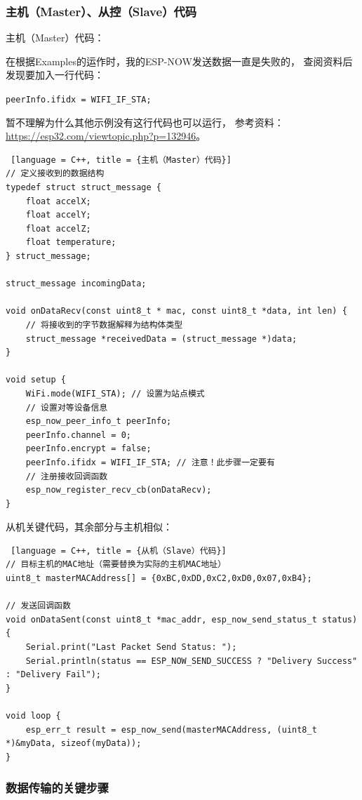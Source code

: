 \subsubsection{主机（Master）、从控（Slave）代码}

主机（Master）代码：

在根据Examples的运作时，我的ESP-NOW发送数据一直是失败的，
查阅资料后发现要加入一行代码：

\texttt{peerInfo.ifidx = WIFI\_IF\_STA;}

暂不理解为什么其他示例没有这行代码也可以运行，
参考资料：\href{https://esp32.com/viewtopic.php?p=132946}{\underline{https://esp32.com/viewtopic.php?p=132946}}。

\begin{lstlisting} [language = C++, title = {主机（Master）代码}]
// 定义接收到的数据结构
typedef struct struct_message {
    float accelX;
    float accelY;
    float accelZ;
    float temperature;
} struct_message;

struct_message incomingData;

void onDataRecv(const uint8_t * mac, const uint8_t *data, int len) {
    // 将接收到的字节数据解释为结构体类型
    struct_message *receivedData = (struct_message *)data;
}

void setup {
    WiFi.mode(WIFI_STA); // 设置为站点模式
    // 设置对等设备信息
    esp_now_peer_info_t peerInfo;
    peerInfo.channel = 0;
    peerInfo.encrypt = false;
    peerInfo.ifidx = WIFI_IF_STA; // 注意！此步骤一定要有
    // 注册接收回调函数
    esp_now_register_recv_cb(onDataRecv);
}

\end{lstlisting}

从机关键代码，其余部分与主机相似：

\begin{lstlisting} [language = C++, title = {从机（Slave）代码}]
// 目标主机的MAC地址（需要替换为实际的主机MAC地址）
uint8_t masterMACAddress[] = {0xBC,0xDD,0xC2,0xD0,0x07,0xB4};

// 发送回调函数
void onDataSent(const uint8_t *mac_addr, esp_now_send_status_t status) {
    Serial.print("Last Packet Send Status: ");
    Serial.println(status == ESP_NOW_SEND_SUCCESS ? "Delivery Success" : "Delivery Fail");
}

void loop {
    esp_err_t result = esp_now_send(masterMACAddress, (uint8_t *)&myData, sizeof(myData));
}
\end{lstlisting}

\subsubsection{数据传输的关键步骤}

